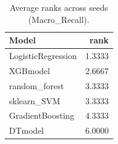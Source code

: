 \begin{table}[t]
\centering
\begin{tabular}{lr}
\toprule
Model & rank \\
\midrule
LogisticRegression & 1.3333 \\
XGBmodel & 2.6667 \\
random_forest & 3.3333 \\
sklearn_SVM & 3.3333 \\
GradientBoosting & 4.3333 \\
DTmodel & 6.0000 \\
\bottomrule
\end{tabular}
\caption{Average ranks across seeds (Macro_Recall).}
\label{tab:avg_rank_Macro_Recall}
\end{table}